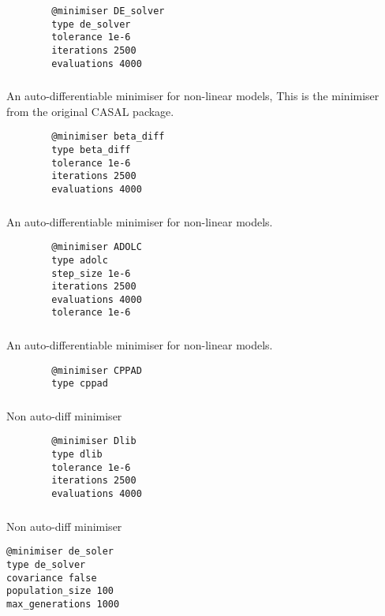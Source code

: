 {\small{\begin{verbatim}
		@minimiser DE_solver
		type de_solver
		tolerance 1e-6
		iterations 2500
		evaluations 4000
		\end{verbatim}}}

\subsubsection{}
An auto-differentiable minimiser for non-linear models, This is the minimiser from the original CASAL package.
{\small{\begin{verbatim}
		@minimiser beta_diff
		type beta_diff
		tolerance 1e-6
		iterations 2500
		evaluations 4000
		\end{verbatim}}}
\subsubsection{}
An auto-differentiable minimiser for non-linear models.
{\small{\begin{verbatim}
		@minimiser ADOLC
		type adolc
		step_size 1e-6
		iterations 2500
		evaluations 4000
		tolerance 1e-6		
		\end{verbatim}}}
\subsubsection{}
An auto-differentiable minimiser for non-linear models.
{\small{\begin{verbatim}
		@minimiser CPPAD
		type cppad
		\end{verbatim}}}

\subsubsection{}
Non auto-diff minimiser
{\small{\begin{verbatim}
		@minimiser Dlib
		type dlib
		tolerance 1e-6
		iterations 2500
		evaluations 4000
		\end{verbatim}}}

\subsubsection{}
Non auto-diff minimiser
{\small{\begin{verbatim}
@minimiser de_soler
type de_solver
covariance false
population_size 100
max_generations 1000
		\end{verbatim}}}

